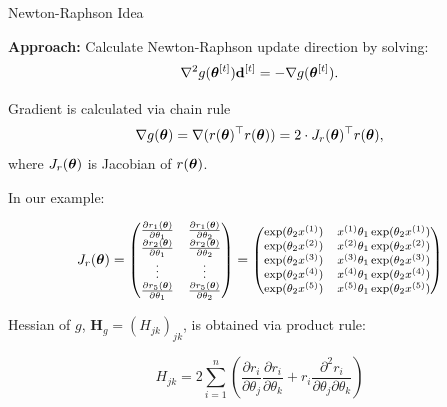 \documentclass[11pt,compress,t,notes=noshow, xcolor=table]{beamer}
\begin{document}
\begin{vbframe}{Newton-Raphson Idea}


\textbf{Approach:} Calculate Newton-Raphson update direction by solving:
\begin{equation*}
    \nabla^2 g(\bm{\theta}^{[t]}) \mathbf{d}^{[t]} = - \nabla g(\bm{\theta}^{[t]}).
\end{equation*}

Gradient is calculated via chain rule
\begin{equation*}
    \nabla g(\bm{\theta}) = \nabla (r(\bm{\theta})^\top r(\bm{\theta})) = 2 \cdot J_r(\bm{\theta})^\top r(\bm{\theta}),
\end{equation*}
where $J_r(\bm{\theta})$ is Jacobian of $r(\bm{\theta})$.

\lz

In our example:

\begin{equation*}
    \footnotesize
    J_r(\bm{\theta}) = \begin{pmatrix} 
        \frac{\partial r_1(\bm{\theta})}{\partial \theta_1} & \frac{\partial r_1(\bm{\theta})}{\partial \theta_2} \\
        \frac{\partial r_2(\bm{\theta})}{\partial \theta_1} & \frac{\partial r_2(\bm{\theta})}{\partial \theta_2} \\
        \vdots & \vdots \\
        \frac{\partial r_5(\bm{\theta})}{\partial \theta_1} & \frac{\partial r_5(\bm{\theta})}{\partial \theta_2}
         \end{pmatrix} = \begin{pmatrix} 
            \exp(\theta_2 x^{(1)}) & x^{(1)} \theta_ 1 \exp(\theta_2 x^{(1)}) \\
            \exp(\theta_2 x^{(2)}) & x^{(2)} \theta_ 1 \exp(\theta_2 x^{(2)})\\ \exp(\theta_2 x^{(3)}) & x^{(3)} \theta_1 \exp(\theta_2 x^{(3)}) \\
            \exp(\theta_2 x^{(4)}) & x^{(4)} \theta_1 \exp(\theta_2 x^{(4)}) \\ \exp(\theta_2 x^{(5)}) & x^{(5)} \theta_1 \exp(\theta_2 x^{(5)})
         \end{pmatrix}
\end{equation*}

\framebreak 

Hessian of $g$, $\mathbf{H}_g = (H_{jk})_{jk}$, is obtained via product rule:

\begin{equation*}
	H_{jk} = 2 \sum_{i=1}^n \left(\frac{\partial r_i}{\partial \theta_j}\frac{\partial r_i}{\partial \theta_k} + r_i \frac{\partial^2 r_i}{\partial \theta_j \partial \theta_k}\right)
\end{equation*}


\end{vbframe}
\end{document}
